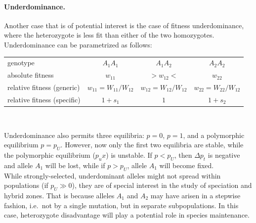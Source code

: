 \paragraph{Underdominance.} Another case that is of potential interest is the case of fitness
underdominance, where the heterozygote is less fit than either of the two
homozygotes. Underdominance can be parametrized as follows: \\
\begin{center}
\begin{tabular}{lccc}
	genotype & $A_1A_1$ & $A_1A_2$ & $A_2A_2$ \\
	absolute fitness & $w_{11}$ & $>w_{12}<$ & $w_{22}$ \\
	relative fitness (generic) & $w_{11}=W_{11}/W_{12}$ & $w_{12} = W_{12}/W_{12}$ & $w_{22} = W_{22}/W_{12}$ \\
	relative fitness (specific)  & $1+s_1$ & $1$ & $1+s_2$ \\
\end{tabular}\\
\end{center}


Underdominance also permits three equilibria: $p=0$, $p=1$, and a
polymorphic equilibrium $p=p_U$. However, now only the first two equilibria are stable, while the polymorphic
equilibrium ($p_ux$) is unstable. If $p<p_U$, then $\Delta p_t $ is negative %
and allele $A_1$ will be lost, while if $p>p_U$, allele
$A_1$ will become fixed.\\


While strongly-selected, underdominant alleles might not spread within populations (if $p_U \gg
0$), they are of special interest in the study of speciation and hybrid zones. That is because alleles $A_1$
and $A_2$ may have arisen in a stepwise fashion, i.e.\ not by a single
mutation,  but in separate subpopulations. In this case, heterozygote disadvantage will play a potential role in species maintenance.\\

